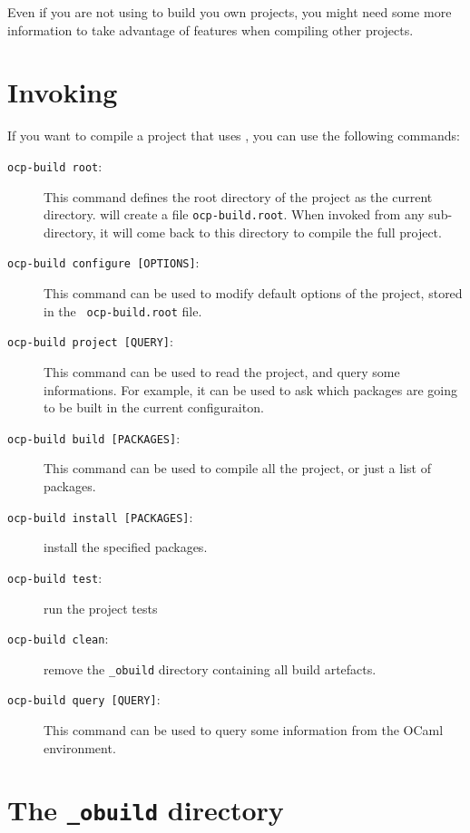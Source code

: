 
Even if you are not using \ocpbuild{} to build you own projects, you
might need some more information to take advantage of \ocpbuild{}
features when compiling other projects.

\section{Invoking \ocpbuild{}}

If you want to compile a project that uses \ocpbuild{}, you can use
the following commands:

\begin{description}
\item[{\tt ocp-build root}:] This command defines the root directory
  of the project as the current directory. \ocpbuild{} will create a
  file {\tt ocp-build.root}. When invoked from any sub-directory, it
  will come back to this directory to compile the full project.
\item[{\tt ocp-build configure [OPTIONS]}:] This command can be used
  to modify default options of the project, stored in the {\tt
    ocp-build.root} file. 
\item[{\tt ocp-build project [QUERY]}:] This command can be used to
  read the project, and query some informations. For example, it can
  be used to ask which packages are going to be built in the current
  configuraiton.
\item[{\tt ocp-build build [PACKAGES]}:] This command can be used to
  compile all the project, or just a list of packages.
\item[{\tt ocp-build install [PACKAGES]}:] install the specified
  packages.
\item[{\tt ocp-build test}:] run the project tests
\item[{\tt ocp-build clean}:] remove the {\tt \_obuild} directory
  containing all build artefacts.
\item[{\tt ocp-build query [QUERY]}:] This command can be used to
  query some information from the OCaml environment.
\end{description}


\section{The {\tt \_obuild} directory}

